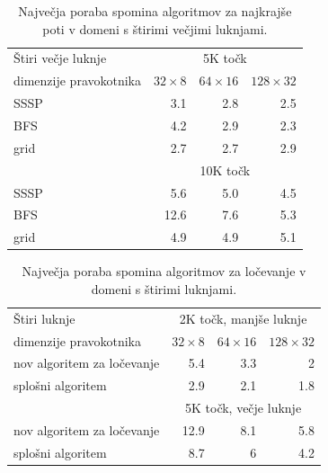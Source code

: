 \documentclass[a4paper, 12pt]{book}
\begin{document}
\begin{table}
\begin{center}
\begin{tabular}{l*{3}{r}}
Štiri večje luknje & \multicolumn{3}{c}{5K točk}\\						
dimenzije pravokotnika	&	$32\times 8$	&	$64\times 16$	&	$128\times 32$	\\
\hline
SSSP	&	3.1	&	2.8	&	2.5		\\
BFS &	4.2	&	2.9	&	2.3 \\
grid	&	2.7	&	2.7	&	2.9	\vspace{.2cm}	\\
\hline
& \multicolumn{3}{c}{10K točk} \\
\hline
SSSP	&	5.6	 &	5.0	&	4.5		\\
BFS &	12.6	&	7.6	&	5.3 \\
grid	&	4.9	&	4.9	&	5.1	\vspace{.2cm}	\\
\end{tabular}
\caption{Največja poraba spomina algoritmov za najkrajše poti v domeni s štirimi večjimi luknjami.}
\label{table-ram-tree-2}
\end{center}
\end{table}

\begin{table}
\begin{center}
\begin{tabular}{l*{3}{r}}
Štiri luknje & \multicolumn{3}{c}{2K točk, manjše luknje}\\						
dimenzije pravokotnika	&	$32\times 8$	&	$64\times 16$	&	$128\times 32$	\\
\hline
nov algoritem za ločevanje	&	5.4	&	3.3	&	2		\\
splošni algoritem	&	2.9	&	2.1	&	1.8	\vspace{.2cm}	\\
\hline
& \multicolumn{3}{c}{5K točk, večje luknje} \\
\hline
nov algoritem za ločevanje	& 12.9	&	8.1	&	5.8		\\
splošni algoritem	&	8.7	&	6	&	4.2	\vspace{.2cm}	\\
\end{tabular}
\caption{Največja poraba spomina algoritmov za ločevanje v domeni s štirimi luknjami.}
\label{table-ram-sep}
\end{center}
\end{table}
\end{document}
